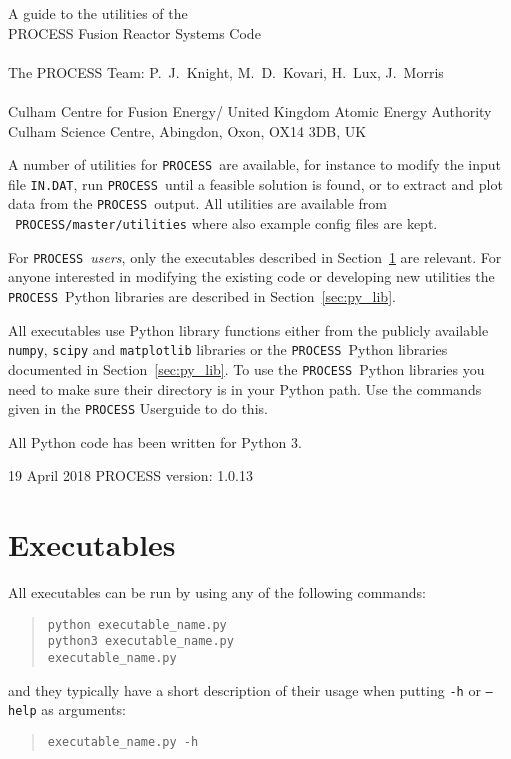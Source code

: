 \documentclass[11pt,a4paper]{article}
\newcommand{\indat}{\mbox{\texttt{IN.DAT}}}
\newcommand{\process}{\mbox{\texttt{PROCESS}}}
\newcommand{\version}{
19 April 2018
\hfill
PROCESS version: 1.0.13
}
\begin{document}
\footnotesize
\hfill

\vspace*{4cm}
\begin{center}
\Huge A guide to the utilities of the \\ PROCESS Fusion Reactor Systems Code\\
~\\ \LARGE The PROCESS Team: P.\ J.\ Knight, M.\ D.\ Kovari, H.\ Lux, J.\ Morris\\
~\\ \Large Culham Centre for Fusion Energy/ United Kingdom Atomic Energy Authority\\
Culham Science Centre, Abingdon, Oxon, OX14 3DB, UK
\end{center}

\normalsize
A number of utilities for \process\ are available, for instance to modify the
input file \indat, run \process\ until a feasible solution is found, or to
extract and plot data from the \process\ output. All utilities are available
from \texttt{~PROCESS/master/utilities} where also example config files are kept.

For \process\ \textit{users}, only the executables described in
Section~\ref{sec:py_exec} are relevant. For anyone interested in modifying the
existing code or developing new utilities the \process\ Python
libraries are described in Section~\ref{sec:py_lib}.

All executables use Python library functions either from the publicly
available \texttt{numpy}, \texttt{scipy} and \texttt{matplotlib} libraries or
the \process\ Python libraries documented in Section~\ref{sec:py_lib}. To use
the \process\ Python libraries you need to make sure their directory is in
your Python path. Use the commands given in the \process\/ Userguide to
do this.

All Python code has been written for Python 3.

\vfill
\footnotesize
\version
\normalsize

\tableofcontents

\newpage

\section{Executables}
\label{sec:py_exec}

All executables can be run by using any of the following commands:
\begin{quote}
\begin{verbatim}
python executable_name.py
python3 executable_name.py
executable_name.py
\end{verbatim}
\end{quote}
and they typically have a short description of their usage when putting
\texttt{-h} or \texttt{--help} as arguments:
\begin{quote}
\begin{verbatim}
executable_name.py -h
\end{verbatim}
\end{quote}
\end{document}
